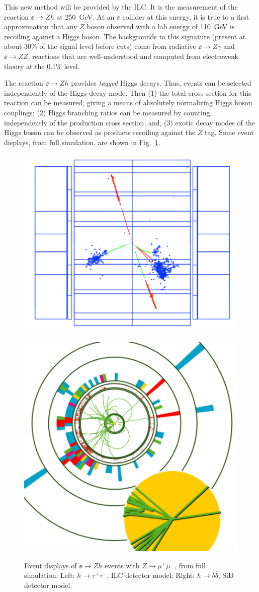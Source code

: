 This new method will be provided by the ILC.  It is the measurement of the reaction $\ee\to Zh$ at 250~GeV.   At an $\ee$ collider at this energy, it is true to a first approximation that any $Z$ boson observed with a lab energy of  110~GeV is recoiling against a Higgs boson.   The backgrounds to this signature (present at about 30\% of the signal level before cuts)  come from radiative $\ee\to Z\gamma$ and $\ee\to ZZ$, reactions that are well-understood and computed from electroweak theory at the 0.1\% level. 

The reaction $\ee\to Zh$ provides {\it tagged} Higgs decays.   Thus, events can be selected independently of the Higgs decay mode.  Then (1) the  total cross section for this reaction can be measured, giving a means of absolutely normalizing Higgs boson couplings; (2)  Higgs branching ratios can be measured  by counting, independently of the production cross section; and, (3)  exotic decay modes of the Higgs boson can be observed as products recoiling against the $Z$ tag.   Some event displays, from full 
simulation, are shown in Fig.~\ref{fig:HiggsEvents}. 

\begin{figure}
\begin{center}
\includegraphics[width=0.5\hsize]{chapters/figures/htotautau.pdf}\ \ 
\includegraphics[width=0.40\hsize]{chapters/figures/htobb.pdf}
\end{center}
\caption{Event displays of $\ee\to Zh$ events  with $Z\to \mu^+\mu^-$, from full simulation: Left: $h\to \tau^+\tau^-$, ILC detector model;  Right: $h\to b\bar b$, SiD detector model.}
\label{fig:HiggsEvents}
\end{figure}

